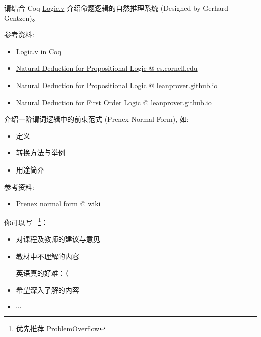 \documentclass[a4paper, justified]{tufte-handout}
\begin{document}
\beginot
\begin{ot}[自然推理系统]
  请结合 Coq
  \href{https://github.com/hengxin/problem-solving-class-coq/blob/master/2019-1-coq/Logic.v}{Logic.v}
  介绍命题逻辑的自然推理系统 (Designed by Gerhard Gentzen)。

  \noindent 参考资料:
  \begin{itemize}
    \item \href{https://github.com/hengxin/problem-solving-class-coq/blob/master/2019-1-coq/Logic.v}{Logic.v} in Coq
    \item \href{https://www.cs.cornell.edu/courses/cs3110/2013sp/lectures/lec15-logic-contd/lec15.html}{Natural Deduction for Propositional Logic @ cs.cornell.edu}
    \item \href{http://leanprover.github.io/logic\_and\_proof/natural\_deduction\_for\_propositional\_logic.html}
          {Natural Deduction for Propositional Logic @ leanprover.github.io}
    \item \href{http://leanprover.github.io/logic\_and\_proof/natural\_deduction\_for\_first\_order\_logic.html}
          {Natural Deduction for First Order Logic @ leanprover.github.io}
  \end{itemize}
\end{ot}

\begin{solution}
\end{solution}

\begin{ot}[前束范式]
  介绍一阶谓词逻辑中的前束范式 (Prenex Normal Form), 如:
  \begin{itemize}
    \item 定义
    \item 转换方法与举例
    \item 用途简介
  \end{itemize}

  \noindent 参考资料:
  \begin{itemize}
    \item \href{https://en.wikipedia.org/wiki/Prenex\_normal\_form}{Prenex normal form @ wiki}
  \end{itemize}
\end{ot}

\begin{solution}
\end{solution}

\begincorrection

\beginfb

你可以写
~\footnote{优先推荐 \href{problemoverflow.top}{ProblemOverflow}}：
\begin{itemize}
  \item 对课程及教师的建议与意见
  \item 教材中不理解的内容

        英语真的好难：（
  \item 希望深入了解的内容
  \item $\cdots$
\end{itemize}
\end{document}
